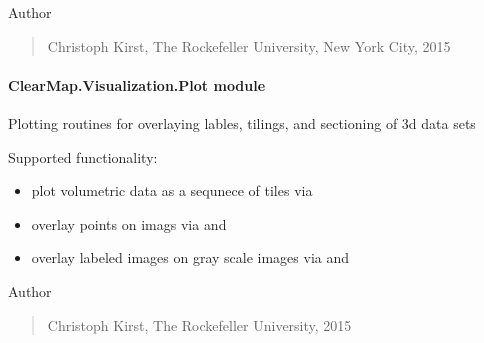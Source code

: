 \documentclass[letterpaper,10pt,english]{sphinxmanual}
\begin{document}
Author
\begin{quote}

Christoph Kirst, The Rockefeller University, New York City, 2015
\end{quote}


\paragraph{ClearMap.Visualization.Plot module}
\label{api/ClearMap.Visualization:module-ClearMap.Visualization.Plot}\label{api/ClearMap.Visualization:clearmap-visualization-plot-module}
Plotting routines for overlaying lables, tilings, and sectioning of 3d data sets

Supported functionality:
\begin{itemize}
\item {} 
plot volumetric data as a sequnece of tiles via {\hyperref[api/ClearMap.Visualization:ClearMap.Visualization.Plot.plotTiling]{\emph{}}}

\item {} 
overlay points on imags via {\hyperref[api/ClearMap.Visualization:ClearMap.Visualization.Plot.overlayPoints]{\emph{}}} and
{\hyperref[api/ClearMap.Visualization:ClearMap.Visualization.Plot.plotOverlayPoints]{\emph{}}}

\item {} 
overlay labeled images on gray scale images via {\hyperref[api/ClearMap.Visualization:ClearMap.Visualization.Plot.overlayLabel]{\emph{}}} and
{\hyperref[api/ClearMap.Visualization:ClearMap.Visualization.Plot.plotOverlayLabel]{\emph{}}}

\end{itemize}

Author
\begin{quote}

Christoph Kirst, The Rockefeller University, 2015
\end{quote}
\end{document}
